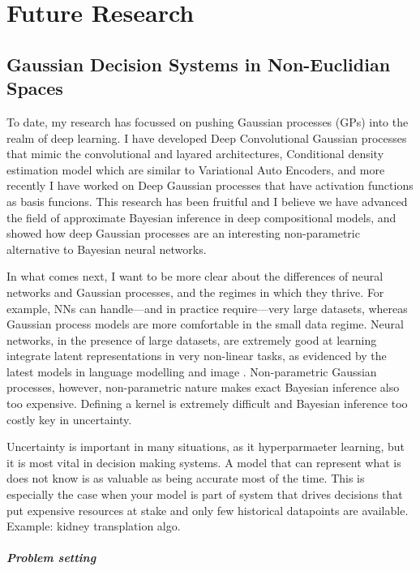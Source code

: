 \chapter{Future Research}
\label{chapter:future-research}

\section{Gaussian Decision Systems in Non-Euclidian Spaces}

To date, my research has focussed on pushing Gaussian processes (GPs) into the realm of deep learning. I have developed Deep Convolutional Gaussian processes that mimic the convolutional and layared architectures, Conditional density estimation model which are similar to Variational Auto Encoders, and more recently I have worked on Deep Gaussian processes that have activation functions as basis funcions. This research has been fruitful and I believe we have advanced the field of approximate Bayesian inference in deep compositional models, and showed how deep Gaussian processes are an interesting non-parametric alternative to Bayesian neural networks.

In what comes next, I want to be more clear about the differences of neural networks and Gaussian processes, and the regimes in which they thrive. For example, NNs can handle---and in practice require---very large datasets, whereas Gaussian process models are more comfortable in the small data regime. Neural networks, in the presence of large datasets, are extremely good at learning integrate latent representations in very non-linear tasks, as evidenced by the latest models in language modelling and image . Non-parametric Gaussian processes, however, 
non-parametric nature makes exact Bayesian inference also too expensive. 
Defining a kernel is extremely difficult and Bayesian inference too costly
key in uncertainty.

Uncertainty is important in many situations, as it hyperparmaeter learning, but it is most vital in decision making systems. A model that can represent what is does not know is as valuable as being accurate most of the time. This is especially the case when your model is part of system that drives decisions that put expensive resources at stake and only few historical datapoints are available. Example: kidney transplation algo.

\paragraph{Problem setting}

